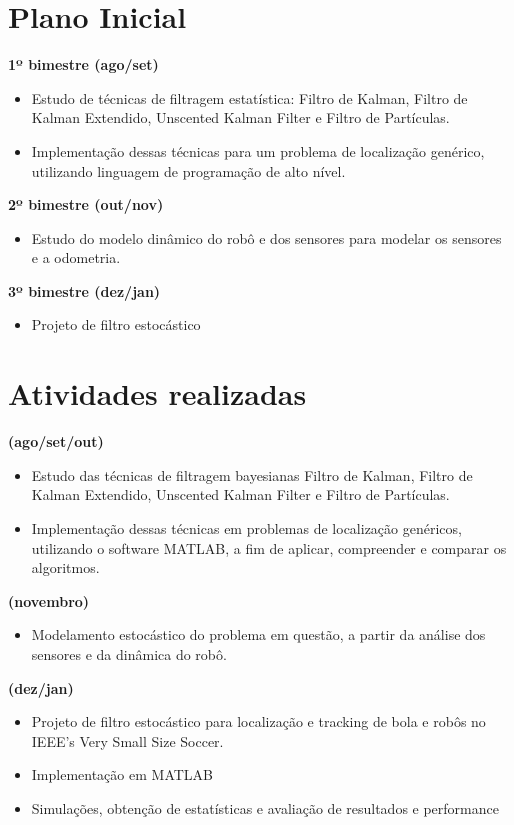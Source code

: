 \documentclass[paper=a4, fontsize=11pt]{scrartcl}
\begin{document}
\section{Plano Inicial}
\textbf{1º bimestre (ago/set)}
\begin{itemize}
    \item Estudo de técnicas de filtragem estatística: Filtro de Kalman, Filtro de Kalman Extendido, Unscented Kalman Filter e Filtro de Partículas.
    \item Implementação dessas técnicas para um problema de localização genérico, utilizando linguagem de programação de alto nível.
\end{itemize}
\textbf{2º bimestre (out/nov)}
\begin{itemize}
    \item Estudo do modelo dinâmico do robô e dos sensores para modelar os sensores e a odometria.
\end{itemize}
\textbf{3º bimestre (dez/jan)}
\begin{itemize}
    \item Projeto de filtro estocástico
\end{itemize}

\section{Atividades realizadas}
\textbf{(ago/set/out)}
\begin{itemize}
    \item Estudo das técnicas de filtragem bayesianas Filtro de Kalman, Filtro de Kalman Extendido, Unscented Kalman Filter e Filtro de Partículas.
    \item Implementação dessas técnicas em problemas de localização genéricos, utilizando o software MATLAB, a fim de aplicar, compreender e comparar os algoritmos.
\end{itemize}
\textbf{(novembro)}
\begin{itemize}
    \item Modelamento estocástico do problema em questão, a partir da análise dos sensores e da dinâmica do robô.
\end{itemize}
\textbf{(dez/jan)}
\begin{itemize}
    \item Projeto de filtro estocástico para localização e tracking de bola e robôs no IEEE’s Very Small Size Soccer.
    \item Implementação em MATLAB
    \item Simulações, obtenção de estatísticas e avaliação de resultados e performance 
\end{itemize}
\end{document}
